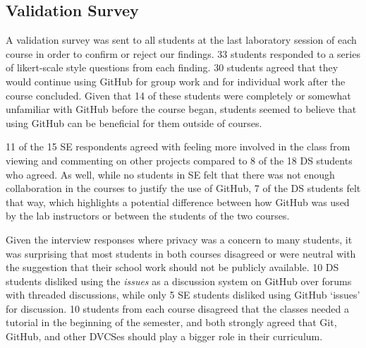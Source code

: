 

\subsection{Validation Survey}

A validation survey was sent to all students at the last laboratory session of each course in order to confirm or reject our findings. 33 students responded to a series of likert-scale style questions from each finding. 30 students agreed that they would continue using GitHub for group work and for individual work after the course concluded. Given that 14 of these students were completely or somewhat unfamiliar with GitHub before the course began, students seemed to believe that using GitHub can be beneficial for them outside of courses.

11 of the 15 SE respondents agreed with feeling more involved in the class from viewing and commenting on other projects compared to 8 of the 18 DS students who agreed. As well, while no students in SE felt that there was not enough collaboration in the courses to justify the use of GitHub, 7 of the DS students felt that way, which highlights a potential difference between how GitHub was used by the lab instructors or between the students of the two courses. %

Given the interview responses where privacy was a concern to many students, it was surprising that most students in both courses disagreed or were neutral with the suggestion that their school work should not be publicly available. 10 DS students disliked using the \emph{issues} as a discussion system on GitHub over forums with threaded discussions, while only 5 SE students disliked using GitHub `issues' for discussion. 10 students from each course disagreed that the classes needed a tutorial in the beginning of the semester, and both strongly agreed that Git, GitHub, and other DVCSes should play a bigger role in their curriculum.


